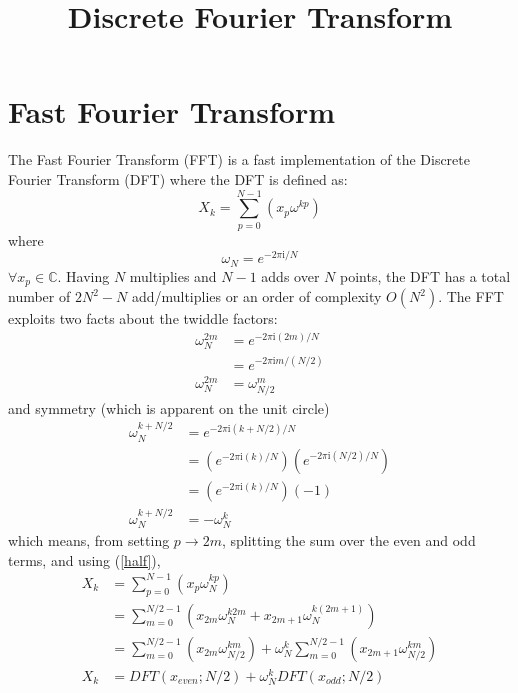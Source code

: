 \documentclass{article}
\begin{document}
%
\title{Discrete Fourier Transform}
%
\maketitle
%
\section {Fast Fourier Transform}
%
The Fast Fourier Transform (FFT) is a fast implementation of the Discrete Fourier Transform (DFT) where the DFT is defined as:
%
\begin {equation} \label {eq:dft}
X_k = \sum_{p = 0}^{N-1} (x_p \omega^{k p})
\end {equation}
%
where
%
\begin {equation} \label {eq:twiddle}
\omega_N = e^{-2 \pi \mathrm {i} / N}
\end {equation}
%
$\forall x_p \in \mathbb {C}$. Having $N$ multiplies and $N-1$ adds over $N$ points, the DFT has a total number of $2 N^2 - N$ add/multiplies or an order of complexity $O(N^2)$. The FFT exploits two facts about the twiddle factors:
%
\begin {equation} \label {half}
\begin {aligned}
\omega_N^{2m} &= e^{-2 \pi \mathrm {i} (2m) / N}    \\
              &= e^{-2 \pi \mathrm {i} m / (N / 2)} \\
\omega_N^{2m} &= \omega_{N/2}^m
\end {aligned}
\end {equation}
%
and symmetry (which is apparent on the unit circle)
%
\begin {equation} \label {symmetry}
\begin {aligned}
\omega_N^{k + N/2} &= e^{-2 \pi \mathrm {i} (k + N/2) / N} \\
             &= \left (e^{-2 \pi \mathrm {i} (k) / N} \right) \left (e^{-2 \pi \mathrm {i} (N/2) / N} \right) \\
             &= \left (e^{-2 \pi \mathrm {i} (k) / N} \right) \left (-1 \right) \\
\omega_N^{k + N/2} &= -\omega_{N}^{k}
\end {aligned}
\end {equation}
%
which means, from setting $p \rightarrow 2m$, splitting the sum over the even and odd terms, and using (\ref{half}),
%
\begin {equation} \label {eq:xk}
\begin {aligned}
X_k &= \sum_{p = 0}^{N-1} (x_p \omega_N^{k p}) \\
    &= \sum_{m = 0}^{N/2-1} (x_{2m} \omega_N^{k 2 m} + x_{2m+1} \omega_N^{k (2 m + 1)}) \\
    &= \sum_{m = 0}^{N/2-1} (x_{2m} \omega_{N/2}^{k m}) + \omega_N^{k} \sum_{m = 0}^{N/2-1} (x_{2m+1} \omega_{N/2}^{km}) \\
X_k &= DFT(x_{even}; N/2) + \omega_N^{k} DFT(x_{odd}; N/2)
\end {aligned}
\end {equation}
\end{document}
